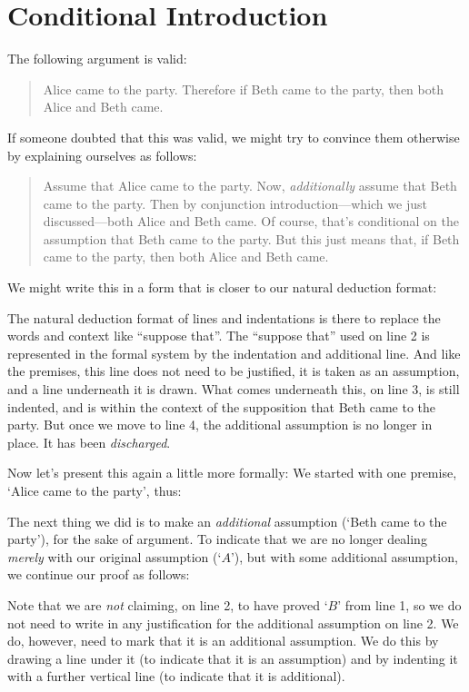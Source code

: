 \section{Conditional Introduction}
The following argument is valid:
	\begin{quote}
		Alice came to the party. Therefore if Beth came to the party, then both Alice and Beth came.
	\end{quote}
If someone doubted that this was valid, we might try to convince them otherwise by explaining ourselves as follows:
	\begin{quote}
		Assume that Alice came to the party. Now, \emph{additionally} assume that Beth came to the party. Then by conjunction introduction---which we just discussed---both Alice and Beth came. Of course, that's conditional on the assumption that Beth came to the party. But this just means that, if Beth came to the party, then both Alice and Beth came.
	\end{quote}

We might write this in a form that is closer to our natural deduction format:
\begin{pf}
	\open
		\close
\end{pf}\medskip
The natural deduction format of lines and indentations is there to replace the words and context like ``suppose that''. The ``suppose that'' used on line 2 is represented in the formal system by the indentation and additional line. And like the premises, this line does not need to be justified, it is taken as an assumption, and a line underneath it is drawn. What comes underneath this, on line 3, is still indented, and is within the context of the supposition that Beth came to the party. But once we move to line 4, the additional assumption is no longer in place. It has been \emph{discharged}.

Now let's present this again a little more formally: We started with one premise, `Alice came to the party', thus:
	\begin{pf}
	\end{pf}
The next thing we did is to make an \emph{additional} assumption (`Beth came to the party'), for the sake of argument. To indicate that we are no longer dealing \emph{merely} with our original assumption (`$A$'), but with some additional assumption, we continue our proof as follows:
	\begin{pf}
	\hypo{r}{A}
		\open
			\hypo{l}{B}
	\end{pf}
Note that we are \emph{not} claiming, on line 2, to have proved `$B$' from line 1, so we do not need to write in any justification for the additional assumption on line 2. We do, however, need to mark that it is an additional assumption. We do this by drawing a line under it (to indicate that it is an assumption) and by indenting it with a further vertical line (to indicate that it is additional).


